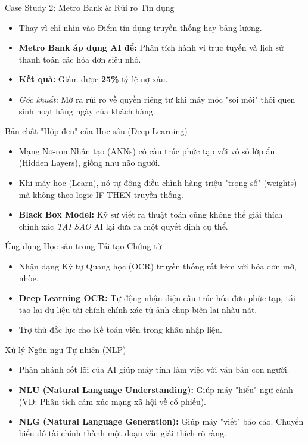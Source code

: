 \documentclass[aspectratio=169,12pt]{beamer}
\begin{document}
\begin{frame}{Case Study 2: Metro Bank \& Rủi ro Tín dụng}
    \begin{itemize}
        \item Thay vì chỉ nhìn vào Điểm tín dụng truyền thống hay bảng lương.
        \item \textbf{Metro Bank áp dụng AI để:} Phân tích hành vi trực tuyến và lịch sử thanh toán các hóa đơn siêu nhỏ.
        \item \textbf{Kết quả:} Giảm được \textbf{25\%} tỷ lệ nợ xấu.
        \item \textit{Góc khuất:} Mở ra rủi ro về quyền riêng tư khi máy móc "soi mói" thói quen sinh hoạt hàng ngày của khách hàng.
    \end{itemize}
\end{frame}

\begin{frame}{Bản chất "Hộp đen" của Học sâu (Deep Learning)}
    \begin{itemize}
        \item Mạng Nơ-ron Nhân tạo (ANNs) có cấu trúc phức tạp với vô số lớp ẩn (Hidden Layers), giống như não người.
        \item Khi máy học (Learn), nó tự động điều chỉnh hàng triệu "trọng số" (weights) mà không theo logic IF-THEN truyền thống.
        \item \textbf{Black Box Model:} Kỹ sư viết ra thuật toán cũng không thể giải thích chính xác \textit{TẠI SAO} AI lại đưa ra một quyết định cụ thể.
    \end{itemize}
\end{frame}

\begin{frame}{Ứng dụng Học sâu trong Tái tạo Chứng từ}
    \begin{itemize}
        \item Nhận dạng Ký tự Quang học (OCR) truyền thống rất kém với hóa đơn mờ, nhòe.
        \item \textbf{Deep Learning OCR:} Tự động nhận diện cấu trúc hóa đơn phức tạp, tái tạo lại dữ liệu tài chính chính xác từ ảnh chụp biên lai nhàu nát.
        \item Trợ thủ đắc lực cho Kế toán viên trong khâu nhập liệu.
    \end{itemize}
\end{frame}

\begin{frame}{Xử lý Ngôn ngữ Tự nhiên (NLP)}
    \begin{itemize}
        \item Phân nhánh cốt lõi của AI giúp máy tính làm việc với văn bản con người.
        \item \textbf{NLU (Natural Language Understanding):} Giúp máy "hiểu" ngữ cảnh (VD: Phân tích cảm xúc mạng xã hội về cổ phiếu).
        \item \textbf{NLG (Natural Language Generation):} Giúp máy "viết" báo cáo. Chuyển biểu đồ tài chính thành một đoạn văn giải thích rõ ràng.
    \end{itemize}
\end{frame}
\end{document}
